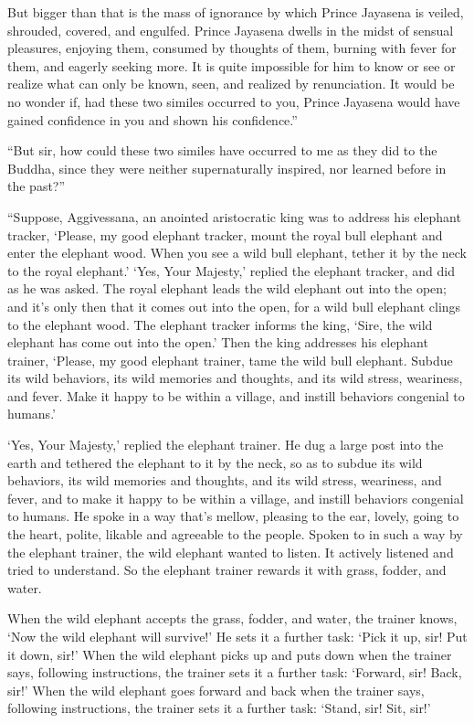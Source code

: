 \documentclass[12pt,openany]{book}%
\begin{document}
But bigger than that is the mass of ignorance by which Prince Jayasena is veiled, shrouded, covered, and engulfed. Prince Jayasena dwells in the midst of sensual pleasures, enjoying them, consumed by thoughts of them, burning with fever for them, and eagerly seeking more. It is quite impossible for him to know or see or realize what can only be known, seen, and realized by renunciation. It would be no wonder if, had these two similes occurred to you, Prince Jayasena would have gained confidence in you and shown his confidence.” 

“But sir, how could these two similes have occurred to me as they did to the Buddha, since they were neither supernaturally inspired, nor learned before in the past?” 

“Suppose, Aggivessana, an anointed aristocratic king was to address his elephant tracker, ‘Please, my good elephant tracker, mount the royal bull elephant and enter the elephant wood. When you see a wild bull elephant, tether it by the neck to the royal elephant.’ ‘Yes, Your Majesty,’ replied the elephant tracker, and did as he was asked. The royal elephant leads the wild elephant out into the open; and it’s only then that it comes out into the open, for a wild bull elephant clings to the elephant wood. The elephant tracker informs the king, ‘Sire, the wild elephant has come out into the open.’ Then the king addresses his elephant trainer, ‘Please, my good elephant trainer, tame the wild bull elephant. Subdue its wild behaviors, its wild memories and thoughts, and its wild stress, weariness, and fever. Make it happy to be within a village, and instill behaviors congenial to humans.’ 

‘Yes, Your Majesty,’ replied the elephant trainer. He dug a large post into the earth and tethered the elephant to it by the neck, so as to subdue its wild behaviors, its wild memories and thoughts, and its wild stress, weariness, and fever, and to make it happy to be within a village, and instill behaviors congenial to humans. He spoke in a way that’s mellow, pleasing to the ear, lovely, going to the heart, polite, likable and agreeable to the people. Spoken to in such a way by the elephant trainer, the wild elephant wanted to listen. It actively listened and tried to understand. So the elephant trainer rewards it with grass, fodder, and water. 

When the wild elephant accepts the grass, fodder, and water, the trainer knows, ‘Now the wild elephant will survive!’ He sets it a further task: ‘Pick it up, sir! Put it down, sir!’ When the wild elephant picks up and puts down when the trainer says, following instructions, the trainer sets it a further task: ‘Forward, sir! Back, sir!’ When the wild elephant goes forward and back when the trainer says, following instructions, the trainer sets it a further task: ‘Stand, sir! Sit, sir!’ 
\end{document}
